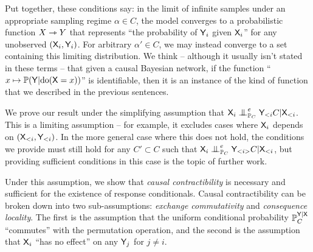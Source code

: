 Put together, these conditions say: in the limit of infinite samples under an appropriate sampling regime $\alpha\in C$, the model converges to a probabilistic function $X\rightarrowtriangle Y$ that represents ``the probability of $\mathsf{Y}_i$ given $\mathsf{X}_i$'' for any unobserved $(\mathsf{X}_i,\mathsf{Y}_i)$. For arbitrary $\alpha'\in C$, we may instead converge to a set containing this limiting distribution. We think -- although it usually isn't stated in these terms -- that given a causal Bayesian network, if the function ``$x\mapsto \mathbb{P}(\mathsf{Y}|\mathrm{do}(\mathsf{X}=x))$'' is identifiable, then it is an instance of the kind of function that we described in the previous sentences.

We prove our result under the simplifying assumption that $\RV{X}_i\CI_{\prob{P}_C}^e \RV{Y}_{<i} C|\RV{X}_{<i}$. This is a limiting assumption -- for example, it excludes cases where $\mathsf{X}_i$ depends on $(\mathsf{X}_{<i},\mathsf{Y}_{<i})$. In the more general case where this does not hold, the conditions we provide must still hold for any $C'\subset C$ such that $\RV{X}_i\CI_{\prob{P}_C}^e \RV{Y}_{<i>} C|\RV{X}_{<i}$, but providing sufficient conditions in this case is the topic of further work.

Under this assumption, we show that \emph{causal contractibility} is necessary and sufficient for the existence of response conditionals. Causal contractibility can be broken down into two sub-assumptions: \emph{exchange commutativity} and \emph{consequence locality}. The first is the assumption that the uniform conditional probability $\mathbb{P}_C^{\mathsf{Y}|\mathsf{X}}$ ``commutes'' with the permutation operation, and the second is the assumption that $\mathsf{X}_i$ ``has no effect'' on any $\mathsf{Y}_j$ for $j\neq i$.






